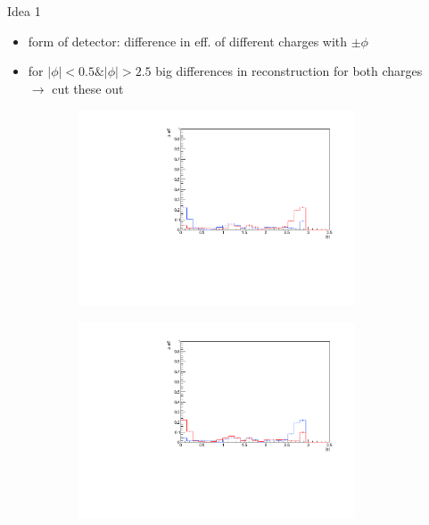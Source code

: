 \documentclass[11pt]{beamer}
\begin{document}
\begin{frame}{Idea 1}
\begin{itemize}
\item form of detector: difference in eff. of different charges with $\pm\phi$
\item for $|\phi|<0.5 \& |\phi|>2.5$ big differences in reconstruction for both charges\\
$\rightarrow$ cut these out
\end{itemize}
\begin{figure}
\begin{subfigure}{0.45\textwidth}
\includegraphics[width=0.9\textwidth]{first/up_pdf/test_u/h_phi_test_SPi_combined.pdf}
\end{subfigure}
\begin{subfigure}{0.45\textwidth}
\includegraphics[width=0.9\textwidth]{first/down_pdf/test_d/h_phi_test_SPi_combined.pdf}
\end{subfigure}
\end{figure}
\end{frame}
\end{document}
